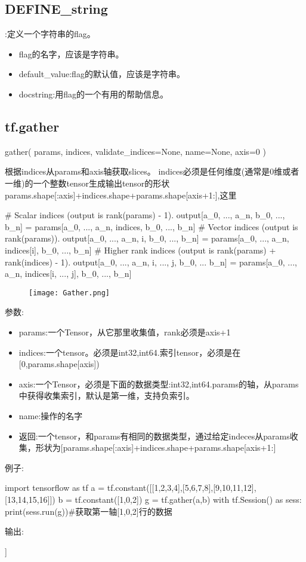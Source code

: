 \subsection{DEFINE\_string}:定义一个字符串的flag。
\begin{itemize}
\item flag的名字，应该是字符串。
\item default\_value:flag的默认值，应该是字符串。
\item docstring:用flag的一个有用的帮助信息。
\end{itemize}
\subsection{tf.gather}
\begin{python}
gather(
    params,
    indices,
    validate_indices=None,
    name=None,
    axis=0
	)
\end{python}
根据indices从params和axis轴获取slices。
indices必须是任何维度(通常是0维或者一维)的一个整数tensor生成输出tensor的形状params.shape[:axis]+indices.shape+params.shape[axis+1:],这里
\begin{python}
# Scalar indices (output is rank(params) - 1).
output[a_0, ..., a_n, b_0, ..., b_n] =
params[a_0, ..., a_n, indices, b_0, ..., b_n]
# Vector indices (output is rank(params)).
output[a_0, ..., a_n, i, b_0, ..., b_n] =
params[a_0, ..., a_n, indices[i], b_0, ..., b_n]
# Higher rank indices (output is rank(params) + rank(indices) - 1).
output[a_0, ..., a_n, i, ..., j, b_0, ... b_n] =
params[a_0, ..., a_n, indices[i, ..., j], b_0, ..., b_n]
\end{python}
\begin{figure}[H]
	\texttt{[image: Gather.png]}
\end{figure}
参数:
\begin{itemize}
	\item params:一个Tensor，从它那里收集值，rank必须是axis+1
	\item indices:一个tensor。必须是int32,int64.索引tensor，必须是在[0,params.shape[axis])
	\item axis:一个Tensor，必须是下面的数据类型:int32,int64.params的轴，从params中获得收集索引，默认是第一维，支持负索引。
	\item name:操作的名字
	\item{返回}:一个tensor，和params有相同的数据类型，通过给定indeces从params收集，形状为[params.shape[:axis]+indices.shape+params.shape[axis+1:]
\end{itemize}
例子:
\begin{python}
import tensorflow as tf
a = tf.constant([[1,2,3,4],[5,6,7,8],[9,10,11,12],[13,14,15,16]])
b = tf.constant([1,0,2])
g = tf.gather(a,b)
with tf.Session() as sess:
    print(sess.run(g))#获取第一轴[1,0,2]行的数据
\end{python}
输出:
\begin{python}
[[ 5  6  7  8]
 [ 1  2  3  4]
 [ 9 10 11 12]]
\end{python}
